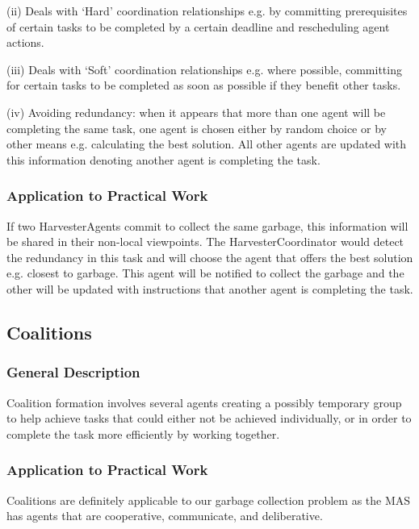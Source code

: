 (ii) Deals with ‘Hard’ coordination relationships e.g. by committing prerequisites of certain tasks to be completed by a certain deadline and rescheduling agent actions. 

(iii) Deals with ‘Soft’ coordination relationships e.g. where possible, committing for certain tasks to be completed as soon as possible if they benefit other tasks. 

(iv) Avoiding redundancy:  when it appears that more than one agent will be completing the same task, one agent is chosen either by random choice or by other means e.g. calculating the best solution. All other agents are updated with this information denoting another agent is completing the task. 

\subsubsection{Application to Practical Work}

If two HarvesterAgents commit to collect the same garbage, this information will be shared in their non-local viewpoints. The HarvesterCoordinator would detect the redundancy in this task and will choose the agent that offers the best solution e.g. closest to garbage.  This agent will be notified to collect the garbage and the other will be updated with instructions that another agent is completing the task. 



\subsection{Coalitions}

\subsubsection{General Description}

Coalition formation involves several agents creating a possibly temporary group to help achieve tasks that could either not be achieved individually, or in order to complete the task more efficiently by working together.

\subsubsection{Application to Practical Work}

Coalitions are definitely applicable to our garbage collection problem as the MAS has agents that are cooperative, communicate, and deliberative.
 
